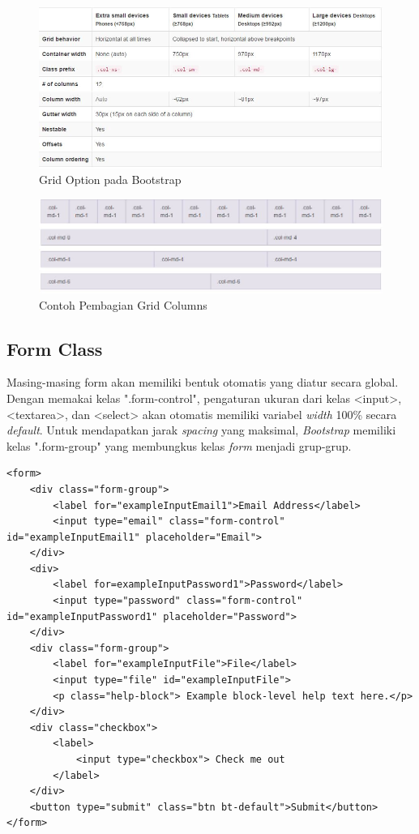\begin{figure}[H]
	\centering
	\includegraphics[scale=0.75]{Gambar/gridOption}
	\caption{Grid Option pada Bootstrap}
	\label{fig:gridOpt}
\end{figure}

\begin{figure}[H]
	\centering
	\includegraphics[scale=0.75]{Gambar/kolom}
	\caption{Contoh Pembagian Grid Columns}
	\label{fig:gridCol}
\end{figure}

\subsection{Form Class}
\label{sub: formClass}
	Masing-masing form akan memiliki bentuk otomatis yang diatur secara global. Dengan memakai kelas ".form-control", pengaturan ukuran dari kelas <input>, <textarea>, dan <select> akan otomatis memiliki variabel \textit{width} 100\% secara \textit{default}. Untuk mendapatkan jarak \textit{spacing} yang maksimal, \textit{Bootstrap} memiliki kelas ".form-group" yang membungkus kelas \textit{form} menjadi grup-grup.
	
\begin{lstlisting}[caption= Contoh penggunaan Twitter Bootstrap]
<form>
	<div class="form-group">
		<label for="exampleInputEmail1">Email Address</label>
		<input type="email" class="form-control" id="exampleInputEmail1" placeholder="Email">
	</div>
	<div>
		<label for=exampleInputPassword1">Password</label>
		<input type="password" class="form-control" id="exampleInputPassword1" placeholder="Password">
	</div>
	<div class="form-group">
		<label for="exampleInputFile">File</label>
		<input type="file" id="exampleInputFile">
		<p class="help-block"> Example block-level help text here.</p>
	</div>
	<div class="checkbox">
		<label>
			<input type="checkbox"> Check me out
		</label>
	</div>
	<button type="submit" class="btn bt-default">Submit</button>
</form>
\end{lstlisting}


